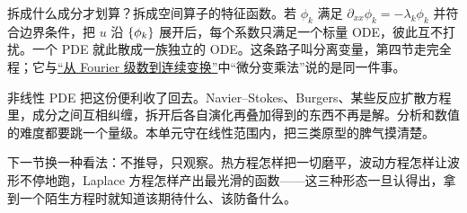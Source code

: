拆成什么成分才划算？拆成空间算子的特征函数。若 \(\phi_k\) 满足 \(\partial_{xx}\phi_k=-\lambda_k\phi_k\) 并符合边界条件，把 \(u\) 沿 \(\left\{\phi_k\right\}\) 展开后，每个系数只满足一个标量 ODE，彼此互不打扰。一个 PDE 就此散成一族独立的 ODE。这条路子叫分离变量，第四节走完全程；它与\hyperref[sec:08-Numerical-Analysis/08-Fourier-and-Spectral-Methods/01]{``从 Fourier 级数到连续变换''}中``微分变乘法''说的是同一件事。

非线性 PDE 把这份便利收了回去。Navier--Stokes、Burgers、某些反应扩散方程里，成分之间互相纠缠，拆开后各自演化再叠加得到的东西不再是解。分析和数值的难度都要跳一个量级。本单元守在线性范围内，把三类原型的脾气摸清楚。

下一节换一种看法：不推导，只观察。热方程怎样把一切磨平，波动方程怎样让波形不停地跑，Laplace 方程怎样产出最光滑的函数——这三种形态一旦认得出，拿到一个陌生方程时就知道该期待什么、该防备什么。

